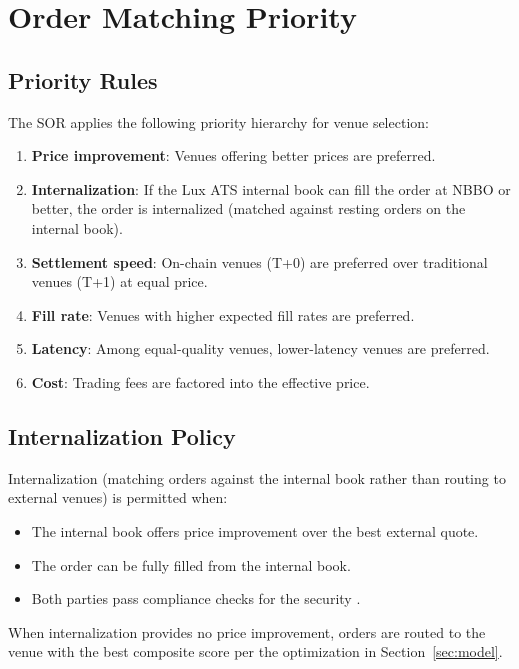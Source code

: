 \documentclass[11pt,a4paper]{article}
\begin{document}
\section{Order Matching Priority}\label{sec:priority}

\subsection{Priority Rules}

The SOR applies the following priority hierarchy for venue selection:

\begin{enumerate}[nosep]
  \item \textbf{Price improvement}: Venues offering better prices are preferred.
  \item \textbf{Internalization}: If the Lux ATS internal book can fill the order at NBBO or better, the order is internalized (matched against resting orders on the internal book).
  \item \textbf{Settlement speed}: On-chain venues (T+0) are preferred over traditional venues (T+1) at equal price.
  \item \textbf{Fill rate}: Venues with higher expected fill rates are preferred.
  \item \textbf{Latency}: Among equal-quality venues, lower-latency venues are preferred.
  \item \textbf{Cost}: Trading fees are factored into the effective price.
\end{enumerate}

\subsection{Internalization Policy}

Internalization (matching orders against the internal book rather than routing to external venues) is permitted when:

\begin{itemize}[nosep]
  \item The internal book offers price improvement over the best external quote.
  \item The order can be fully filled from the internal book.
  \item Both parties pass compliance checks for the security \cite{lux-security-token-standard}.
\end{itemize}

When internalization provides no price improvement, orders are routed to the venue with the best composite score per the optimization in Section~\ref{sec:model}.
\end{document}
